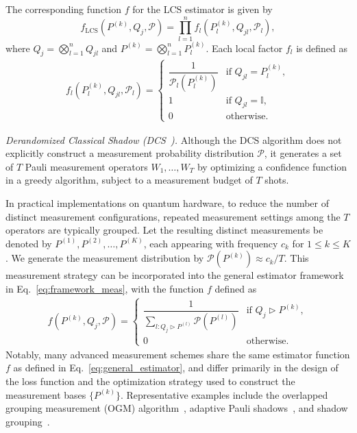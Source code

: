 \documentclass[prl,aps,notitlepage,superscriptaddress,showpacs,nofootinbib]{revtex4-2}
\begin{document}
The corresponding function $f$ for the LCS estimator is given by
\begin{equation}
    f_{\text{LCS}} \left(P^{(k)}, Q_j, \mathcal{P} \right) = \prod_{l=1}^n f_l\left(P^{(k)}_l, Q_{jl}, \mathcal{P}_l \right),
\end{equation}
where $Q_j = \bigotimes_{l=1}^n Q_{jl}$ and $P^{(k)} = \bigotimes_{l=1}^n P^{(k)}_l$. Each local factor $f_l$ is defined as
\begin{align}
    f_l\left(P^{(k)}_l, Q_{jl}, \mathcal{P}_l \right) =
    \begin{cases}
        \dfrac{1}{\mathcal{P}_l\left(P^{(k)}_l\right)} & \text{if } Q_{jl} = P^{(k)}_l, \\
        1 & \text{if } Q_{jl} = \mathbb{I}, \\
        0 & \text{otherwise}.
    \end{cases}
\end{align}

\textit{Derandomized Classical Shadow (DCS~\cite{Huang2021Efficient}).}
Although the DCS algorithm does not explicitly construct a measurement probability distribution $\mathcal{P}$, it generates a set of $T$ Pauli measurement operators $W_1, \ldots, W_T$ by optimizing a confidence function in a greedy algorithm, subject to a measurement budget of $T$ shots. 

In practical implementations on quantum hardware, to reduce the number of distinct measurement configurations, repeated measurement settings among the $T$ operators are typically grouped. Let the resulting distinct measurements be denoted by $P^{(1)}, P^{(2)}, \ldots, P^{(K)}$, each appearing with frequency $c_k$ for $1 \leq k \leq K$. We generate the measurement distribution by $\mathcal{P}(P^{(k)}) \approx c_k / T$. This measurement strategy can be incorporated into the general estimator framework in Eq.~\eqref{eq:framework_meas}, with the function $f$ defined as
\begin{align}
    f\left(P^{(k)}, Q_j, \mathcal{P} \right) =
    \begin{cases}
        \dfrac{1}{\sum_{l : Q_j \triangleright P^{(l)}} \mathcal{P}(P^{(l)})} & \text{if } Q_j \triangleright P^{(k)}, \\
        0 & \text{otherwise}.
    \end{cases}
    \label{eq:general_estimator}
\end{align}
Notably, many advanced measurement schemes share the same estimator function $f$ as defined in Eq.~\eqref{eq:general_estimator}, and differ primarily in the design of the loss function and the optimization strategy used to construct the measurement bases $\{P^{(k)}\}$. Representative examples include the overlapped grouping measurement (OGM) algorithm~\cite{wu2023overlapped}, adaptive Pauli shadows~\cite{Shlosberg2023Adaptive}, and shadow grouping~\cite{gresch2025guaranteed}.
 
\end{document}
